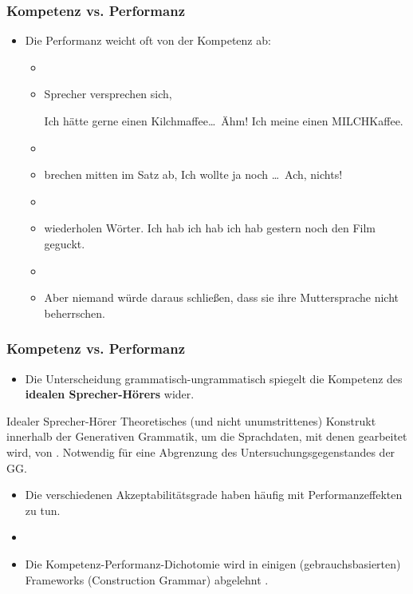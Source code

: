 \begin{frame}
\frametitle{Kompetenz vs. Performanz}

\begin{itemize}
	\item Die Performanz weicht oft von der Kompetenz ab: 
	\begin{itemize}
		\item[]
		\item Sprecher versprechen sich, 
		
\pause		
		\ea Ich hätte gerne einen Kilchmaffee\dots\ Ähm! Ich meine einen MILCHKaffee.
		\z

\pause
		\item[]		
		\item brechen mitten im Satz ab,
\pause		
		\ea Ich wollte ja noch \dots\ Ach, nichts!
		\z
		 
		\item[] 
		\item wiederholen Wörter.
\pause		
		\ea Ich hab ich hab ich hab gestern noch den Film geguckt.
		\z
		
		\item[]
		\item[]	Aber niemand würde daraus schließen, dass sie ihre Muttersprache nicht beherrschen.
	\end{itemize}

\end{itemize}

\end{frame}


\begin{frame}
\frametitle{Kompetenz vs. Performanz}

\begin{itemize}

	\item Die Unterscheidung grammatisch-ungrammatisch spiegelt die Kompetenz des \textbf{idealen Sprecher-Hörers} wider.
\end{itemize}

\begin{block}{Idealer Sprecher-Hörer}
Theoretisches (und nicht unumstrittenes) Konstrukt innerhalb der Generativen Grammatik, um die Sprachdaten, mit denen gearbeitet wird, von . Notwendig für eine Abgrenzung des Untersuchungsgegenstandes der GG.
\end{block}

\begin{itemize}
	\item Die verschiedenen Akzeptabilitätsgrade haben häufig mit Performanzeffekten zu tun.
	\item[]
	\item Die Kompetenz-Performanz-Dichotomie wird in einigen (gebrauchsbasierten) Frameworks (\zB Construction Grammar) abgelehnt \citep[vgl.][]{MuellerS15b, Nolda&Co14a}. 
\end{itemize}

\end{frame}


